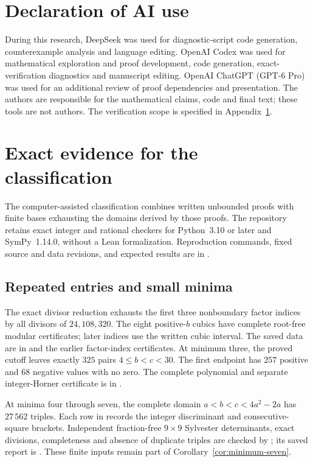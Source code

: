\documentclass[11pt]{article}
\theoremstyle{remark}
\begin{document}
\section*{Declaration of AI use}
During this research, DeepSeek was used for diagnostic-script code
generation, counterexample analysis and language editing. OpenAI Codex
was used for mathematical exploration and proof development, code
generation, exact-verification diagnostics and manuscript editing.
OpenAI ChatGPT (GPT-6 Pro) was used for an additional review of proof
dependencies and presentation. The authors are responsible for the
mathematical claims, code and final text; these tools are not authors.
The verification scope is specified in Appendix~\ref{sec:verification}.


\appendix
\section{Exact evidence for the classification}
\label{sec:verification}
The computer-assisted classification combines written unbounded proofs
with finite bases exhausting the domains derived by those proofs.
The repository~\cite{repository} retains exact integer and rational
checkers for Python~3.10 or later and SymPy~1.14.0, without a Lean formalization.
Reproduction commands, fixed source and data revisions, and expected
results are in .

\subsection{Repeated entries and small minima}
The exact divisor reduction exhausts the first three nonboundary
factor indices by all divisors of $24,108,320$. The eight positive-$b$
cubics have complete root-free modular certificates; later indices use
the written cubic interval. The saved data are in
 and the earlier
factor-index certificates. At minimum three, the proved cutoff leaves
exactly $325$ pairs $4\leq b<c<30$. The first endpoint has $257$ positive
and $68$ negative values with no zero. The complete polynomial and
separate integer-Horner certificate is in .

At minima four through seven, the complete domain
$a<b<c<4a^2-2a$ has $27\,562$ triples. Each row in
 records the integer
discriminant and consecutive-square brackets. Independent fraction-free
$9\times9$ Sylvester determinants, exact divisions, completeness and
absence of duplicate triples are checked by
; its saved report is
.
These finite inputs remain part of Corollary~\ref{cor:minimum-seven}.
\end{document}
